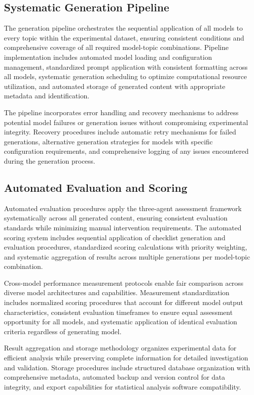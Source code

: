 \subsection{Systematic Generation Pipeline}

The generation pipeline orchestrates the sequential application of all models to every topic within the experimental dataset, ensuring consistent conditions and comprehensive coverage of all required model-topic combinations. Pipeline implementation includes automated model loading and configuration management, standardized prompt application with consistent formatting across all models, systematic generation scheduling to optimize computational resource utilization, and automated storage of generated content with appropriate metadata and identification.

The pipeline incorporates error handling and recovery mechanisms to address potential model failures or generation issues without compromising experimental integrity. Recovery procedures include automatic retry mechanisms for failed generations, alternative generation strategies for models with specific configuration requirements, and comprehensive logging of any issues encountered during the generation process.

\subsection{Automated Evaluation and Scoring}

Automated evaluation procedures apply the three-agent assessment framework systematically across all generated content, ensuring consistent evaluation standards while minimizing manual intervention requirements. The automated scoring system includes sequential application of checklist generation and evaluation procedures, standardized scoring calculations with priority weighting, and systematic aggregation of results across multiple generations per model-topic combination.

Cross-model performance measurement protocols enable fair comparison across diverse model architectures and capabilities. Measurement standardization includes normalized scoring procedures that account for different model output characteristics, consistent evaluation timeframes to ensure equal assessment opportunity for all models, and systematic application of identical evaluation criteria regardless of generating model.

Result aggregation and storage methodology organizes experimental data for efficient analysis while preserving complete information for detailed investigation and validation. Storage procedures include structured database organization with comprehensive metadata, automated backup and version control for data integrity, and export capabilities for statistical analysis software compatibility.

